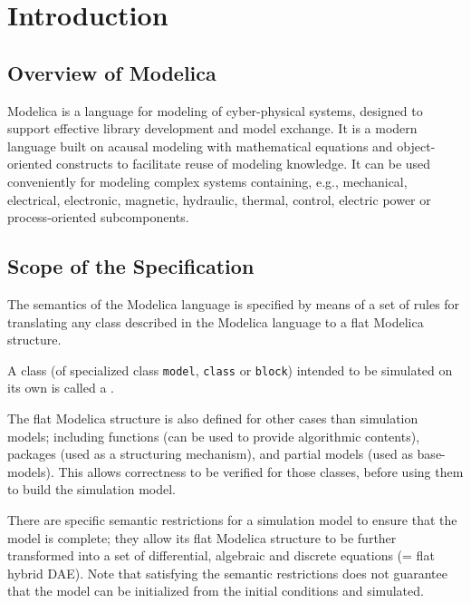 \chapter{Introduction}\label{introduction1}

\section{Overview of Modelica}\label{overview-of-modelica}

Modelica is a language for modeling of cyber-physical systems, designed to support effective library development and model exchange.
It is a modern language built on acausal modeling with mathematical equations and object-oriented constructs to facilitate reuse of modeling knowledge.
It can be used conveniently for modeling complex systems containing, e.g., mechanical, electrical, electronic, magnetic, hydraulic, thermal, control, electric power or process-oriented subcomponents.

\section{Scope of the Specification}\label{scope-of-the-specification}

The semantics of the Modelica language is specified by means of a set of rules for translating any class described in the Modelica language to a flat Modelica structure.

A class (of specialized class \lstinline!model!, \lstinline!class! or \lstinline!block!) intended to be simulated on its own is called a .

The flat Modelica structure is also defined for other cases than simulation models; including functions (can be used to provide algorithmic contents), packages (used as a structuring mechanism), and partial models (used as base-models).
This allows correctness to be verified for those classes, before using them to build the simulation model.

There are specific semantic restrictions for a simulation model to ensure that the model is complete; they allow its flat Modelica structure to be further transformed into a set of differential, algebraic and discrete equations (= flat hybrid DAE).
Note that satisfying the semantic restrictions does not guarantee that the model can be initialized from the initial conditions and simulated.

